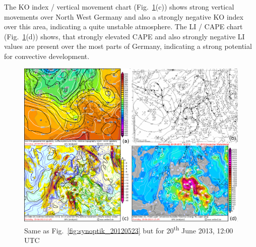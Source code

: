 The KO index / vertical movement chart (Fig.~\ref{fig:synoptik_20130620}(c)) shows strong vertical movements over North West Germany and also a strongly negative KO index over this area, indicating a quite unstable atmosphere. The LI / CAPE chart (Fig.~\ref{fig:synoptik_20130620}(d)) shows, that strongly elevated CAPE and also strongly negative LI values are present over the most parts of Germany, indicating a strong potential for convective development.

\begin{figure}[htbp]
	\centering
	\includegraphics[width=\linewidth]{Grafiken/Abbildungen/synoptik_20130620.png}
	\caption{Same as Fig.~\ref{fig:synoptik_20120523} but for 20\textsuperscript{th} June 2013, 12:00 UTC}
    \label{fig:synoptik_20130620}  
\end{figure}

